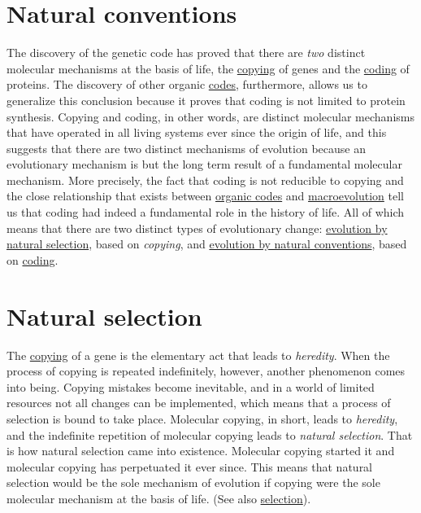 \documentclass[12pt]{article}
\begin{document}
\section{Natural conventions}
The discovery of the genetic code has proved that there are \textit{two} distinct molecular mechanisms at the basis of life, the \hyperlink{copying_and_coding}{copying} of genes and the \hyperlink{copying_and_coding}{coding} of proteins. The discovery of other organic \hyperlink{code}{codes}, furthermore, allows us to generalize this conclusion because it proves that coding is not limited to protein synthesis. Copying and coding, in other words, are distinct molecular mechanisms that have operated in all living systems ever since the origin of life, and this suggests that there are two distinct mechanisms of evolution because an evolutionary mechanism is but the long term result of a fundamental molecular mechanism. More precisely, the fact that coding is not reducible to copying and the close relationship that exists between \hyperlink{organic_codes}{organic codes} and \hyperlink{macroevolution}{macroevolution} tell us that coding had indeed a fundamental role in the history of life. All of which means that there are two distinct types of evolutionary change: \hyperlink{natural_selection}{evolution by natural selection}, based on \textit{copying}, and \hyperlink{evolution_by_natural_conventions}{evolution by natural conventions}, based on \hyperlink{copying_and_coding}{coding}.
 

\hypertarget{natural_selection}{}
\section{Natural selection}
The \hyperlink{copying_and_coding}{copying} of a gene is the elementary act that leads to \textit{heredity}. When the process of copying is repeated indefinitely, however, another phenomenon comes into being. Copying mistakes become inevitable, and in a world of limited resources not all changes can be implemented, which means that a process of selection is bound to take place. Molecular copying, in short, leads to \textit{heredity}, and the indefinite repetition of molecular copying leads to \textit{natural selection}. That is how natural selection came into existence. Molecular copying started it and molecular copying has perpetuated it ever since. This means that natural selection would be the sole mechanism of evolution if copying were the sole molecular mechanism at the basis of life. (See also \hyperlink{selection}{selection}).
\end{document}
